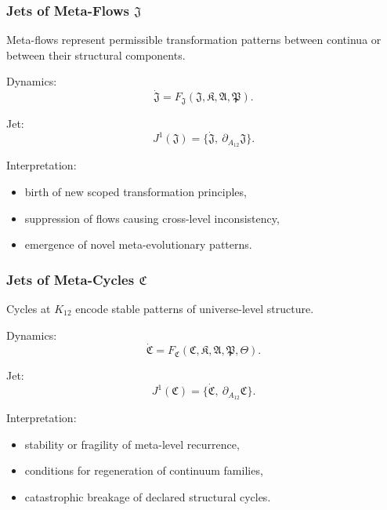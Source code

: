 \subsubsection{Jets of Meta-Flows $\mathfrak{J}$}

Meta-flows represent permissible transformation patterns between
continua or between their structural components.

Dynamics:
\[
\dot{\mathfrak{J}}
=
F_{\mathfrak{J}}(\mathfrak{J},\mathfrak{K},\mathfrak{A},\mathfrak{P}).
\]

Jet:
\[
J^1(\mathfrak{J})
= \{\dot{\mathfrak{J}},\ \partial_{A_{12}}\mathfrak{J}\}.
\]

Interpretation:
\begin{itemize}
    \item birth of new scoped transformation principles,
    \item suppression of flows causing cross-level inconsistency,
    \item emergence of novel meta-evolutionary patterns.
\end{itemize}


\subsubsection{Jets of Meta-Cycles $\mathfrak{C}$}

Cycles at $K_{12}$ encode stable patterns of universe-level structure.

Dynamics:
\[
\dot{\mathfrak{C}}
=
F_{\mathfrak{C}}(\mathfrak{C},\mathfrak{K},\mathfrak{A},\mathfrak{P},\mathfrak{\Theta}).
\]

Jet:
\[
J^1(\mathfrak{C})
= \{\dot{\mathfrak{C}},\ \partial_{A_{12}}\mathfrak{C}\}.
\]

Interpretation:
\begin{itemize}
    \item stability or fragility of meta-level recurrence,
    \item conditions for regeneration of continuum families,
    \item catastrophic breakage of declared structural cycles.
\end{itemize}


